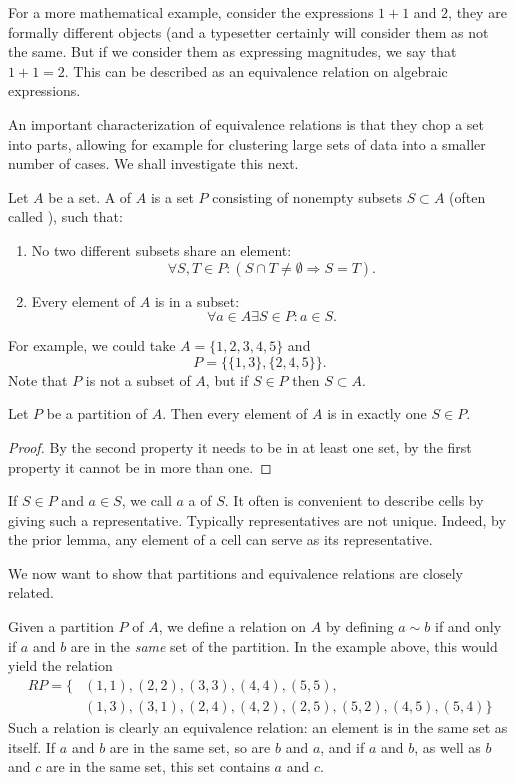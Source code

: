 For a more mathematical example, consider the expressions $1+1$ and $2$, they are formally
different objects (and a typesetter certainly will consider them as not
the same. But if we consider them as expressing magnitudes, we say that
$1+1=2$.
This can be described as an equivalence relation on algebraic expressions.
\medskip

An important characterization of equivalence relations is that they chop a
set into parts, allowing for example for clustering large sets of data into
a smaller number of cases. We shall investigate this next.
\begin{defn}
Let $A$ be a set. A  of $A$ is a set $P$ consisting of nonempty
subsets $S\subset A$ (often called ), such that:
\begin{enumerate}
\item No two different subsets share an element:
\[
\forall S,T\in P: (S\cap T\not=\emptyset\Rightarrow S=T).
\]
\item Every element of $A$ is in a subset: 
\[
\forall a\in A\exists S\in P: a\in S.
\]
\end{enumerate}
\end{defn}
For example, we could take $A=\{1,2,3,4,5\}$ and 
\[
P=\{\{1,3\},\{2,4,5\}\}.
\]
Note that $P$ is not a subset of $A$, but if $S\in P$ then $S\subset A$.

\begin{lemma}
Let $P$ be a partition of $A$. Then every element of $A$ is in exactly one $S\in P$.
\end{lemma}
\begin{proof}
By the second property it needs to be in at least one set, by the first property it
cannot be in more than one.
\end{proof}

If $S\in P$ and $a\in S$, we call $a$ a  of $S$.  It often is
convenient to describe cells by giving such a representative.
Typically representatives are not unique. Indeed, by the prior lemma, any
element of a cell can serve as its representative.
\bigskip

We now want to show that partitions and equivalence relations are closely related.

Given a partition $P$ of $A$, we define a relation on $A$ by
defining $a\sim b$ if and only if $a$ and $b$ are in the {\em same} set of
the partition. In the example above, this would yield the relation
\[
\begin{split}
RP=\{&(1,1),(2,2),(3,3),(4,4),(5,5),\\
&(1,3),(3,1),(2,4),(4,2),(2,5),(5,2),(4,5),(5,4)\}
\end{split}
\]
Such a relation is clearly an equivalence relation: an element is in the
same set as itself. If $a$ and $b$ are in the same set, so are $b$ and $a$,
and if $a$ and $b$, as well as $b$ and $c$ are in the same set, this set
contains $a$ and $c$.

